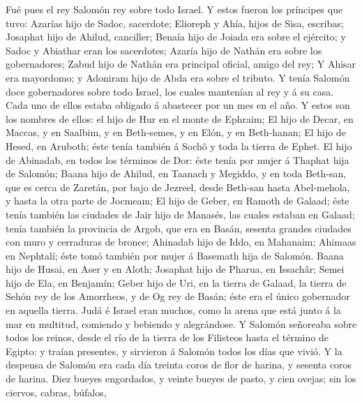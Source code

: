 Fué pues el rey Salomón rey sobre todo Israel.
 Y estos fueron los príncipes que tuvo: Azarías hijo de
Sadoc, sacerdote;  Elioreph y Ahía, hijos de Sisa,
escribas; Josaphat hijo de Ahilud, canciller;  Benaía hijo
de Joiada era sobre el ejército; y Sadoc y Abiathar eran los sacerdotes;
 Azaría hijo de Nathán era sobre los gobernadores; Zabud
hijo de Nathán era principal oficial, amigo del rey;  Y
Ahisar era mayordomo; y Adoniram hijo de Abda era sobre el tributo.
 Y tenía Salomón doce gobernadores sobre todo Israel, los
cuales mantenían al rey y á su casa. Cada uno de ellos estaba obligado á
abastecer por un mes en el año.  Y estos son los nombres
de ellos: el hijo de Hur en el monte de Ephraim;  El hijo
de Decar, en Maccas, y en Saalbim, y en Beth-semes, y en Elón, y en
Beth-hanan;  El hijo de Hesed, en Aruboth; éste tenía
también á Sochô y toda la tierra de Ephet.  El hijo de
Abinadab, en todos los términos de Dor: éste tenía por mujer á Thaphat
hija de Salomón;  Baana hijo de Ahilud, en Taanach y
Megiddo, y en toda Beth-san, que es cerca de Zaretán, por bajo de
Jezreel, desde Beth-san hasta Abel-mehola, y hasta la otra parte de
Jocmeam;  El hijo de Geber, en Ramoth de Galaad; éste
tenía también las ciudades de Jair hijo de Manasés, las cuales estaban
en Galaad; tenía también la provincia de Argob, que era en Basán,
sesenta grandes ciudades con muro y cerraduras de bronce;
 Ahinadab hijo de Iddo, en Mahanaim; 
Ahimaas en Nephtalí; éste tomó también por mujer á Basemath hija de
Salomón.  Baana hijo de Husai, en Aser y en Aloth;
 Josaphat hijo de Pharua, en Issachâr; 
Semei hijo de Ela, en Benjamín;  Geber hijo de Uri, en la
tierra de Galaad, la tierra de Sehón rey de los Amorrheos, y de Og rey
de Basán; éste era el único gobernador en aquella tierra.
 Judá é Israel eran muchos, como la arena que está junto
á la mar en multitud, comiendo y bebiendo y alegrándose. 
Y Salomón señoreaba sobre todos los reinos, desde el río de la tierra de
los Filisteos hasta el término de Egipto: y traían presentes, y
sirvieron á Salomón todos los días que vivió.  Y la
despensa de Salomón era cada día treinta coros de flor de harina, y
sesenta coros de harina.  Diez bueyes engordados, y
veinte bueyes de pasto, y cien ovejas; sin los ciervos, cabras, búfalos,
